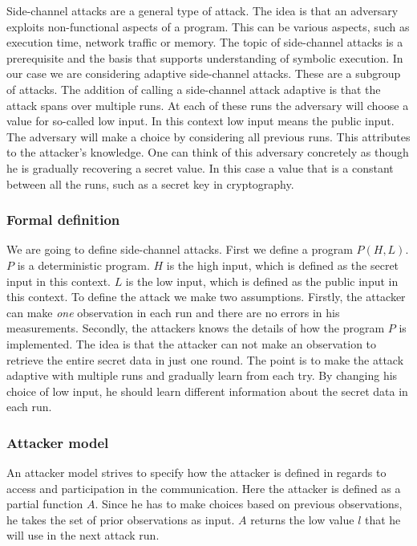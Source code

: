 \documentclass[11pt,a4paper,notitlepage]{article}
\begin{document}
Side-channel attacks are a general type of attack. The idea is that an adversary exploits non-functional aspects of a program. This can be various aspects, such as execution time, network traffic or memory. The topic of side-channel attacks is a prerequisite and the basis that supports understanding of symbolic execution. In our case we are considering adaptive side-channel attacks. These are a subgroup of attacks. The addition of calling a side-channel attack adaptive is that the attack spans over multiple runs. At each of these runs the adversary will choose a value for so-called low input. In this context low input means the public input. The adversary will make a choice by considering all previous runs. This attributes to the attacker's knowledge. One can think of this adversary concretely as though he is gradually recovering a secret value. In this case a value that is a constant between all the runs, such as a secret key in cryptography. 

\subsubsection{Formal definition}

We are going to define side-channel attacks. First we define a program $P(H,L)$. $P$ is a deterministic program. $H$ is the high input, which is defined as the secret input in this context. $L$ is the low input, which is defined as the public input in this context. To define the attack we make two assumptions. Firstly, the attacker can make \textit{one} observation in each run and there are no errors in his measurements. Secondly, the attackers knows the details of how the program $P$ is implemented. The idea is that the attacker can not make an observation to retrieve the entire secret data in just one round. The point is to make the attack adaptive with multiple runs and gradually learn from each try. By changing his choice of low input, he should learn different information about the secret data in each run. 

\subsubsection{Attacker model}

An attacker model strives to specify how the attacker is defined in regards to access and participation in the communication. Here the attacker is defined as a partial function $A$. Since he has to make choices based on previous observations, he takes the set of prior observations as input. $A$ returns the low value $l$ that he will use in the next attack run. 
\end{document}
